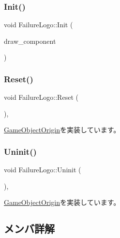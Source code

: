 \subsubsection{\texorpdfstring{Init()}{Init()}}
{\footnotesize\ttfamily void Failure\+Logo\+::\+Init (\begin{DoxyParamCaption}\item[{\mbox{\hyperlink{class_draw_component}{Draw\+Component}} $\ast$}]{draw\+\_\+component }\end{DoxyParamCaption})}

\mbox{\label{class_failure_logo_a542b1617087a6701f7edb345e2a72e01}} 
\subsubsection{\texorpdfstring{Reset()}{Reset()}}
{\footnotesize\ttfamily void Failure\+Logo\+::\+Reset (\begin{DoxyParamCaption}{ }\end{DoxyParamCaption})\hspace{0.3cm}{\ttfamily [override]}, {\ttfamily [virtual]}}



\mbox{\hyperlink{class_game_object_origin_af9af378a4fd9028316a6fdb461ed6a10}{Game\+Object\+Origin}}を実装しています。

\mbox{\label{class_failure_logo_adbe01fc4567ade0e788f511f5162299c}} 
\subsubsection{\texorpdfstring{Uninit()}{Uninit()}}
{\footnotesize\ttfamily void Failure\+Logo\+::\+Uninit (\begin{DoxyParamCaption}{ }\end{DoxyParamCaption})\hspace{0.3cm}{\ttfamily [override]}, {\ttfamily [virtual]}}



\mbox{\hyperlink{class_game_object_origin_aeac8fc4a1f625982313a9a60dd35d016}{Game\+Object\+Origin}}を実装しています。



\subsection{メンバ詳解}
\mbox{\label{class_failure_logo_ab41feac9836e9687c75546098ff8f53c}} 
